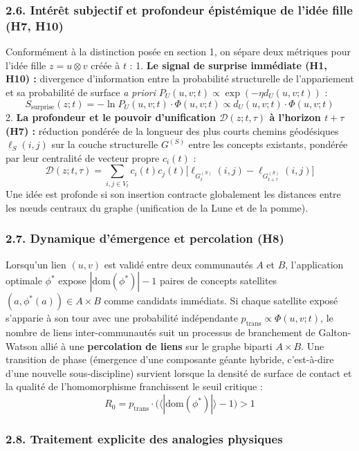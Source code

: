 \documentclass[a4paper,11pt]{article}
\begin{document}
\subsubsection*{2.6. Intérêt subjectif et profondeur épistémique de
l'idée fille (H7, H10)}

Conformément à la distinction posée en section 1, on sépare deux
métriques pour l'idée fille \(z = u \otimes v\) créée à \(t\) : 1.
\textbf{Le signal de surprise immédiate (H1, H10) :} divergence
d'information entre la probabilité structurelle de l'appariement et sa
probabilité de surface \emph{a priori}
\(P_U(u,v;t) \propto \exp(-\eta d_U(u,v;t))\) :
\[S_{\text{surprise}}(z; t) = -\ln P_U(u, v; t) \cdot \Phi(u, v; t) \propto d_U(u, v; t) \cdot \Phi(u, v; t)\]
2. \textbf{La profondeur et le pouvoir d'unification
\(\mathcal{D}(z; t, \tau)\) à l'horizon \(t+\tau\) (H7) :} réduction
pondérée de la longueur des plus courts chemins géodésiques
\(\ell_S(i,j)\) sur la couche structurelle \(G^{(S)}\) entre les
concepts existants, pondérée par leur centralité de vecteur propre
\(c_i(t)\) :
\[\mathcal{D}(z; t, \tau) = \sum_{i, j \in V_t} c_i(t) c_j(t) \Big[ \ell_{G^{(S)}_t}(i, j) - \ell_{G^{(S)}_{t+\tau}}(i, j) \Big]\]
Une idée est profonde si son insertion contracte globalement les
distances entre les nœuds centraux du graphe (unification de la Lune et
de la pomme).

\subsubsection*{2.7. Dynamique d'émergence et percolation (H8)}

Lorsqu'un lien \((u,v)\) est validé entre deux communautés \(A\) et
\(B\), l'application optimale \(\phi^*\) expose
\(|\text{dom}(\phi^*)| - 1\) paires de concepts satellites
\((a, \phi^*(a)) \in A \times B\) comme candidats immédiats. Si chaque
satellite exposé s'apparie à son tour avec une probabilité indépendante
\(p_{\text{trans}} \propto \Phi(u,v;t)\), le nombre de liens
inter-communautés suit un processus de branchement de Galton-Watson
allié à une \textbf{percolation de liens} sur le graphe biparti
\(A \times B\). Une transition de phase (émergence d'une composante
géante hybride, c'est-à-dire d'une nouvelle sous-discipline) survient
lorsque la densité de surface de contact et la qualité de
l'homomorphisme franchissent le seuil critique :
\[R_0 = p_{\text{trans}} \cdot \big(\langle |\text{dom}(\phi^*)| \rangle - 1\big) > 1\]

\subsubsection*{2.8. Traitement explicite des analogies physiques}
\end{document}
